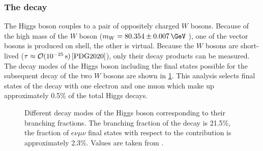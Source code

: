\subsubsection{The \HWWdet decay}
The Higgs boson couples to a pair of oppositely charged $W$ bosons.
Because of the high mass of the $W$ boson ($m_W = 80.354 \pm 0.007\,\GeV$ \cite{PDG2020}), one of the vector bosons is produced on shell, the other is virtual.
Because the $W$ bosons are short-lived ($\tau \approx \mathcal{O}(10^{-25}\,\text{s})\,\text{\cite{PDG2020}}$), only their decay products can be measured. 
The decay modes of the Higgs boson including the final states possible for the subsequent decay of the two $W$ bosons are shown in \cref{fig:h-branching-ratios}. 
This analysis selects final states of the \HWW decay with one electron and one muon which make up approximately 0.5\% of the total Higgs decays. 
\begin{figure}
    \caption{Different decay modes of the Higgs boson corresponding to their branching fractions. The branching fraction of the \HWW decay is 21.5\%, the fraction of $e\nu\mu\nu$ final states with respect to the \HWW contribution is approximately 2.3\%. Values are taken from .}
    \label{fig:h-branching-ratios}
\end{figure}


